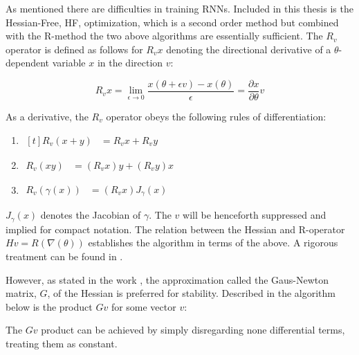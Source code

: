 As mentioned there are difficulties in training RNNs. Included in this thesis is the Hessian-Free, HF, optimization, which is a second order method but combined with the R-method the two above algorithms are essentially sufficient. The $R_v$ operator is defined as follows for $R_vx $ denoting the directional derivative of a $\theta$-dependent variable $x$ in the direction $v$:

\[R_vx = \lim_{\epsilon\to 0} \frac{x(\theta + \epsilon v) - x(\theta)}{\epsilon} = \frac{\partial x}{\partial\theta}v\]

As a derivative, the $R_v$ operator obeys the following rules of differentiation:

\begin{enumerate}
    \item $\begin{aligned}[t]
        R_v(x+y) &= R_vx + R_vy
    \end{aligned} $
    \item $\begin{aligned}
        R_v(xy) &= (R_vx)y + (R_vy)x 
    \end{aligned} $
    \item $\begin{aligned}
        R_v(\gamma(x)) &= (R_vx) J_{\gamma}(x)
    \end{aligned}$
\end{enumerate}

$J_\gamma(x)$ denotes the Jacobian of $\gamma$. The $v$ will be henceforth suppressed and implied for compact notation. The relation between the Hessian and R-operator $Hv = R(\nabla(\theta))$ establishes the algorithm in terms of the above. A rigorous treatment can be found in \cite{suts}.

However, as stated in the work \cite{suts}, the approximation called the Gaus-Newton matrix, \(G\), of the Hessian is preferred for stability. Described in the algorithm below is the product \(Gv\) for some vector $v$:

\begin{algorithmic}[1]
    \EndFor
    \EndFor
    \State {}
\end{algorithmic}

The $Gv$ product can be achieved by simply disregarding none differential terms, treating them as constant. 